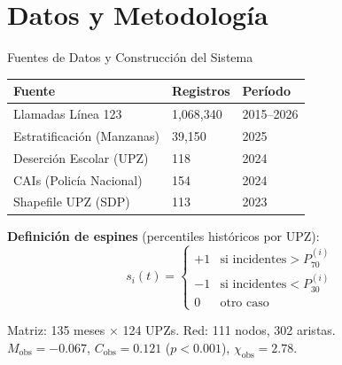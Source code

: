 \documentclass[11pt]{beamer}
\begin{document}
\section{Datos y Metodología}

\begin{frame}{Fuentes de Datos y Construcción del Sistema}

\begin{table}[h]
\centering
\small
\begin{tabular}{l l l}
\toprule
\textbf{Fuente} & \textbf{Registros} & \textbf{Período} \\
\midrule
Llamadas Línea 123 & 1,068,340 & 2015--2026 \\
Estratificación (Manzanas) & 39,150 & 2025 \\
Deserción Escolar (UPZ) & 118 & 2024 \\
CAIs (Policía Nacional) & 154 & 2024 \\
Shapefile UPZ (SDP) & 113 & 2023 \\
\bottomrule
\end{tabular}
\end{table}

\vspace{0.2cm}
\textbf{Definición de espines} (percentiles históricos por UPZ):
\[
s_i(t) = \begin{cases}
+1 & \text{si incidentes} > P_{70}^{(i)} \\
-1 & \text{si incidentes} < P_{30}^{(i)} \\
0  & \text{otro caso}
\end{cases}
\]

Matriz: 135 meses $\times$ 124 UPZs. Red: 111 nodos, 302 aristas.\\
$M_{\text{obs}}=-0.067$, $C_{\text{obs}}=0.121$ ($p<0.001$), $\chi_{\text{obs}}=2.78$.
\end{frame}
\end{document}
